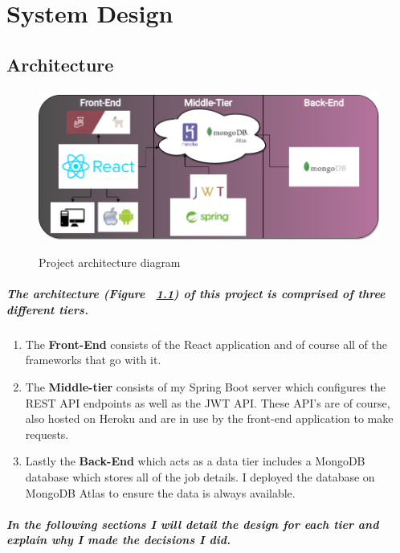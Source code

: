 \chapter{System Design}
\section{Architecture}
\begin{figure}[ht]
    \centering
    \includegraphics[scale=0.35]{Images/Project Architecture.png} 
    \label{proj_label}
    \caption{Project architecture diagram}
\end{figure}
\paragraph{The architecture (Figure ~\ref{proj_label}) of this project is comprised of three different tiers.}
\begin{enumerate}
    \item The \textbf{Front-End} consists of the React application and of course all of the frameworks that go with it.
    \item The \textbf{Middle-tier} consists of my Spring Boot server which configures the REST API endpoints as well as the JWT API. These API's are of course, also hosted on Heroku and are in use by the front-end application to make requests.
    \item Lastly the \textbf{Back-End} which acts as a data tier includes a MongoDB database which stores all of the job details. I deployed the database on MongoDB Atlas to ensure the data is always available.
\end{enumerate}
\paragraph{In the following sections I will detail the design for each tier and explain why I made the decisions I did.}

